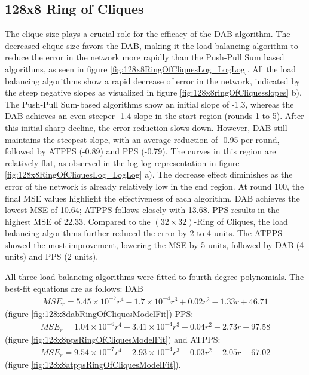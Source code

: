 \subsection{128x8 Ring of Cliques}\label{subsec:128_8ROC}
The clique size plays a crucial role for the efficacy of the DAB algorithm. The decreased clique size favors the DAB, making it the load balancing algorithm to reduce the error in the network more rapidly than the Push-Pull Sum based algorithms, as seen in figure \ref{fig:128x8RingOfCliquesLog_LogLog}. All the load balancing algorithms show a rapid decrease of error in the network, indicated by the steep negative slopes as visualized in figure \ref{fig:128x8ringOfCliquesslopes} b). The Push-Pull Sum-based algorithms show an initial slope of -1.3, whereas the DAB achieves an even steeper -1.4 slope in the start region (rounds 1 to 5). After this initial sharp decline, the error reduction slows down. However, DAB still maintains the steepest slope, with an average reduction of -0.95 per round, followed by ATPPS (-0.89) and PPS (-0.79). The curves in this region are relatively flat, as observed in the log-log representation in figure \ref{fig:128x8RingOfCliquesLog_LogLog} a). The decrease effect diminishes as the error of the network is already relatively low in the end region. At round 100, the final MSE values highlight the effectiveness of each algorithm. DAB achieves the lowest MSE of 10.64; ATPPS follows closely with 13.68. PPS results in the highest MSE of 22.33. Compared to the $(32 \times 32)$-Ring of Cliques, the load balancing algorithms further reduced the error by 2 to 4 units. The ATPPS showed the most improvement, lowering the MSE by 5 units, followed by DAB (4 units) and PPS (2 units).

All three load balancing algorithms were fitted to fourth-degree polynomials. The best-fit equations are as follows: DAB
\begin{align}
    MSE_r=5.45\times 10 ^{-7}r^{4}-1.7\times 10^{-4}r^{3}+0.02r^{2}-1.33r+46.71    
\end{align}
(figure \ref{fig:128x8dabRingOfCliquesModelFit}) PPS:
\begin{align}
    MSE_r=1.04\times 10 ^{-6}r^{4}-3.41\times 10^{-4}r^{3}+0.04r^{2}-2.73r+97.58    
\end{align}
(figure \ref{fig:128x8ppsRingOfCliquesModelFit}) and ATPPS:
\begin{align}
    MSE_r=9.54\times 10^{-7}r^{4}-2.93\times 10^{-4}r^{3}+0.03r^{2}-2.05r+67.02    
\end{align}
(figure \ref{fig:128x8atppsRingOfCliquesModelFit}).

